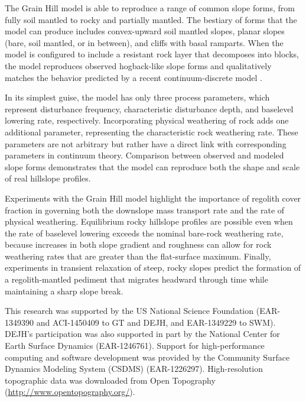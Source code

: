 \documentclass[esurf, manuscript]{copernicus}
\begin{document}
The Grain Hill model is able to reproduce a range of common slope forms, from fully soil mantled to rocky and partially mantled. The bestiary of forms that the model can produce includes convex-upward soil mantled slopes, planar slopes (bare, soil mantled, or in between), and cliffs with basal ramparts. When the model is configured to include a resistant rock layer that decomposes into blocks, the model reproduces observed hogback-like slope forms and qualitatively matches the behavior predicted by a recent continuum-discrete model \citep{glade2017block,glade2017quasi}.

In its simplest guise, the model has only three process parameters, which represent disturbance frequency, characteristic disturbance depth, and baselevel lowering rate, respectively. Incorporating physical weathering of rock adds one additional parameter, representing the characteristic rock weathering rate. These parameters are not arbitrary but rather have a direct link with corresponding parameters in continuum theory. Comparison between observed and modeled slope forms demonstrates that the model can reproduce both the shape and scale of real hillslope profiles.

Experiments with the Grain Hill model highlight the importance of regolith cover fraction in governing both the downslope mass transport rate and the rate of physical weathering. Equilibrium rocky hillslope profiles are possible even when the rate of baselevel lowering exceeds the nominal bare-rock weathering rate, because increases in both slope gradient and roughness can allow for rock weathering rates that are greater than the flat-surface maximum. Finally, experiments in transient relaxation of steep, rocky slopes predict the formation of a regolith-mantled pediment that migrates headward through time while maintaining a sharp slope break.





\begin{acknowledgements}
This research was supported by the US National Science Foundation (EAR-1349390 and ACI-1450409 to GT and DEJH, and EAR-1349229 to SWM). DEJH's participation was also supported in part by the National Center for Earth Surface Dynamics (EAR-1246761). Support for high-performance computing and software development was provided by the Community Surface Dynamics Modeling System (CSDMS) (EAR-1226297). High-resolution topographic data was downloaded from Open Topography (\url{http://www.opentopography.org/}).
\end{acknowledgements}






\end{document}
